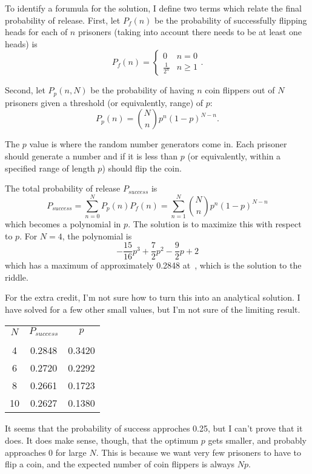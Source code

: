 \documentclass{article}
\begin{document}
To identify a forumula for the solution, I define two terms which relate the final probability of release.
First, let $P_{f}(n)$ be the probability of successfully flipping heads for each of $n$ prisoners (taking into account there needs to be at least one heads) is
\[
P_{f}(n)=
\begin{cases}
0 & n=0 \\
\frac{1}{2^{n}} & n\geq1
\end{cases}
.
\]

Second, let $P_{p}(n,N)$ be the probability of having $n$ coin flippers out of $N$ prisoners given a threshold (or equivalently, range) of $p$:
\[
P_{p}(n)=\binom{N}{n}p^{n}(1-p)^{N-n}.
\]

The $p$ value is where the random number generators come in.
Each prisoner should generate a number and if it is less than $p$ (or equivalently, within a specified range of length $p$) should flip the coin.

The total probability of release $P_{success}$ is
\[
P_{success}=\sum_{n=0}^{N}P_{p}(n)P_{f}(n)=\sum_{n=1}^{N}\binom{N}{n}p^{n}(1-p)^{N-n}
\]
which becomes a polynomial in $p$.
The solution is to maximize this with respect to $p$.
For $N=4$, the polynomial is
\[
-\frac{15}{16}p^{3}+\frac{7}{2}p^{2}-\frac{9}{2}p+2
\]
which has a maximum of approximately 0.2848 at
\,,
which is the solution to the riddle.

For the extra credit, I'm not sure how to turn this into an analytical solution.
I have solved for a few other small values, but I'm not sure of the limiting result.

\begin{center}
\begin{tabular}{c c c}
$N$ & $P_{success}$ & $p$ \\
    &               & \\
4   & 0.2848        & 0.3420 \\
6   & 0.2720        & 0.2292 \\
8   & 0.2661        & 0.1723 \\
10  & 0.2627        & 0.1380
\end{tabular}
\end{center}

It seems that the probability of success approches 0.25, but I can't prove that it does.
It does make sense, though, that the optimum $p$ gets smaller, and probably approaches 0 for large $N$.
This is because we want very few prisoners to have to flip a coin, and the expected number of coin flippers is always $Np$.
\end{document}
